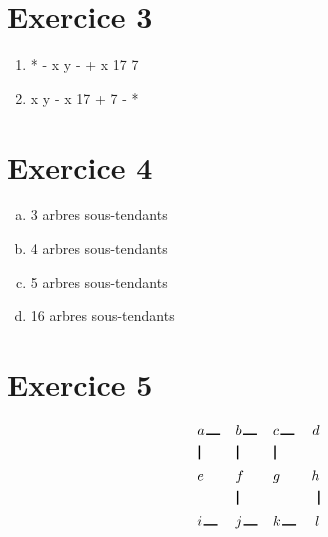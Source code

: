 \documentclass[fontsize=10pt]{article}
\begin{document}
\section*{Exercice 3}
\begin{enumerate}
\item * - x y - + x 17 7
\item x y - x 17 + 7 - *
\end{enumerate}

\section*{Exercice 4}
\begin{enumerate}[(a)]
\item 3 arbres sous-tendants
\item 4 arbres sous-tendants
\item 5 arbres sous-tendants
\item 16 arbres sous-tendants
\end{enumerate}

\section*{Exercice 5}
\begin{alignat*}{10}
&a \hspace{1pt}\rule{10pt}{1pt} \hspace{1pt}&&b\hspace{1pt}\rule{10pt}{1pt} \hspace{1pt}&&c\hspace{1pt}\rule{10pt}{1pt}\hspace{1pt} &d\\
& \hspace{1pt}\rule{1pt}{10pt}&&\hspace{1pt}\rule{1pt}{10pt} &&\hspace{1pt}\rule{1pt}{10pt} &\\
&e &&f &&g &h\\
& &&\hspace{1pt}\rule{1pt}{10pt} && &\hspace{1pt}\rule{1pt}{10pt}\\
&i\hspace{1pt}\rule{10pt}{1pt} \hspace{1pt} &&j \hspace{1pt}\rule{10pt}{1pt} \hspace{1pt}&&k\hspace{1pt}\rule{10pt}{1pt} \hspace{1pt} &l
\end{alignat*}
\end{document}
